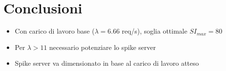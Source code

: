 \section{Conclusioni}
\begin{frame}{\secname}
    \begin{itemize}
        \item Con carico di lavoro base (\(\lambda = 6.66\) req/s), soglia ottimale \(SI_{max} = 80\)
        \item Per \(\lambda > 11\) necessario potenziare lo spike server
        \item Spike server va dimensionato in base al carico di lavoro atteso
    \end{itemize}
\end{frame}